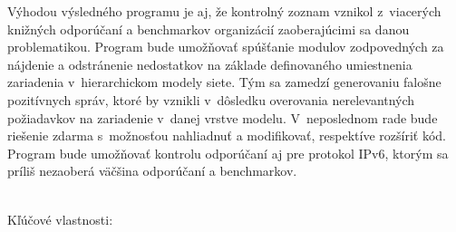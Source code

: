 Výhodou výsledného programu je aj, že kontrolný zoznam vznikol z~viacerých knižných odporúčaní a benchmarkov organizácií zaoberajúcimi sa danou problematikou. Program bude umožňovať spúšťanie modulov zodpovedných za nájdenie a odstránenie nedostatkov na základe definovaného umiestnenia zariadenia v~hierarchickom modely siete. Tým sa zamedzí generovaniu falošne pozitívnych správ, ktoré by vznikli v~dôsledku overovania nerelevantných požiadavkov na zariadenie v~danej vrstve modelu. V~neposlednom rade bude riešenie zdarma s~možnosťou nahliadnuť a modifikovať, respektíve rozšíriť kód. Program bude umožňovať kontrolu odporúčaní aj pre protokol IPv6, ktorým sa príliš nezaoberá väčšina odporúčaní a benchmarkov.

\noindent
\\
Kľúčové vlastnosti:

